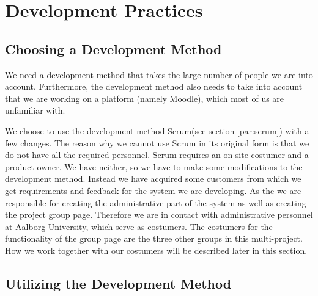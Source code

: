 \section{Development Practices} %

\subsection{Choosing a Development Method}
We need a development method that takes the large number of people we are into account.
Furthermore, the development method also needs to take into account that we are working on a platform (namely Moodle), which most of us are unfamiliar with.

We choose to use the development method Scrum(see section \ref{par:scrum}) with a few changes.
The reason why we cannot use Scrum in its original form is that we do not have all the required personnel. 
Scrum requires an on-site costumer and a product owner.
We have neither, so we have to make some modifications to the development method.
Instead we have acquired some customers from which we get requirements and feedback for the system we are developing.
As the \groupname{} we are responsible for creating the administrative part of the system as well as creating the project group page.
Therefore we are in contact with administrative personnel at Aalborg University, which serve as costumers.
The costumers for the functionality of the group page are the three other groups in this multi-project.
How we work together with our costumers will be described later in this section.

\subsection{Utilizing the Development Method}












